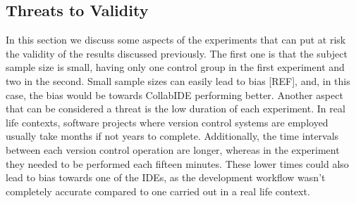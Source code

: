 \subsection{Threats to Validity}
In this section we discuss some aspects of the experiments that can put at risk the validity of the results discussed previously. The first one is that the subject sample size is small, having only one control group in the first experiment and two in the second. Small sample sizes can easily lead to bias [REF], and, in this case, the bias would be towards CollabIDE performing better. Another aspect that can be considered a threat is the low duration of each experiment. In real life contexts, software projects where version control systems are employed usually take months if not years to complete. Additionally, the time intervals between each version control operation are longer, whereas in the experiment they needed to be performed each fifteen minutes. These lower times could also lead to bias towards one of the IDEs, as the development workflow wasn't completely accurate compared to one carried out in a real life context. 


\endinput
